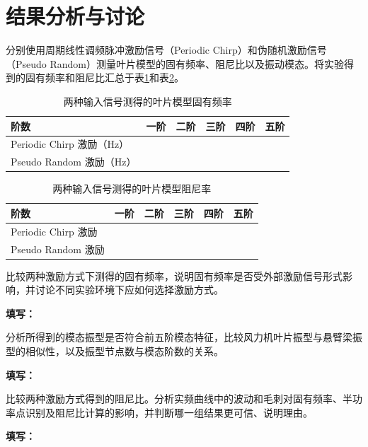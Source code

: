 \documentclass[UTF8,a4paper,12pt]{ctexart}
\newcommand{\blank}[1][2.5cm]{\mbox{\underline{\hspace{#1}}}}
\newcommand{\answer}{\par\noindent\textbf{填写：}\blank[0.86\textwidth]\par}
\numberwithin{equation}{section}
\begin{document}
\section{结果分析与讨论}
分别使用周期线性调频脉冲激励信号（Periodic Chirp）和伪随机激励信号（Pseudo Random）测量叶片模型的固有频率、阻尼比以及振动模态。将实验得到的固有频率和阻尼比汇总于表\ref{tab:exp5-frequency-compare}和表\ref{tab:exp5-damping-compare}。

\begin{table}[H]
\centering\small
\caption{两种输入信号测得的叶片模型固有频率}
\label{tab:exp5-frequency-compare}
\begin{tabular}{lccccc}
\toprule
阶数 & 一阶 & 二阶 & 三阶 & 四阶 & 五阶\\
\midrule
Periodic Chirp 激励（Hz） & \blank[1.1cm] & \blank[1.1cm] & \blank[1.1cm] & \blank[1.1cm] & \blank[1.1cm]\\
Pseudo Random 激励（Hz） & \blank[1.1cm] & \blank[1.1cm] & \blank[1.1cm] & \blank[1.1cm] & \blank[1.1cm]\\
\bottomrule
\end{tabular}
\end{table}

\begin{table}[H]
\centering\small
\caption{两种输入信号测得的叶片模型阻尼率}
\label{tab:exp5-damping-compare}
\begin{tabular}{lccccc}
\toprule
阶数 & 一阶 & 二阶 & 三阶 & 四阶 & 五阶\\
\midrule
Periodic Chirp 激励 & \blank[1.1cm] & \blank[1.1cm] & \blank[1.1cm] & \blank[1.1cm] & \blank[1.1cm]\\
Pseudo Random 激励 & \blank[1.1cm] & \blank[1.1cm] & \blank[1.1cm] & \blank[1.1cm] & \blank[1.1cm]\\
\bottomrule
\end{tabular}
\end{table}

比较两种激励方式下测得的固有频率，说明固有频率是否受外部激励信号形式影响，并讨论不同实验环境下应如何选择激励方式。
\answer

分析所得到的模态振型是否符合前五阶模态特征，比较风力机叶片振型与悬臂梁振型的相似性，以及振型节点数与模态阶数的关系。
\answer

比较两种激励方式得到的阻尼比。分析实频曲线中的波动和毛刺对固有频率、半功率点识别及阻尼比计算的影响，并判断哪一组结果更可信、说明理由。
\answer
\end{document}
